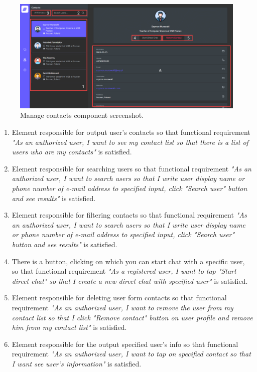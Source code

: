 \begin{figure}[H]
    \centering
    \includegraphics[width=1\textwidth]{Pictures/10_Messenger_manage_contacts}
    \caption{Manage contacts component screenshot.}\label{fig:figure10}
\end{figure}
\begin{enumerate}
    \item Element responsible for output user's contacts so that functional requirement
    \textit{"As an authorized user, I want to see my contact list so that there is a list of users
    who are my contacts"} is satisfied.
    \item Element responsible for searching users so that functional requirement
    \textit{"As an authorized user, I want to search users so that I write user display name or phone number
    of e-mail address to specified input, click "Search user" button and see
    results"} is satisfied.
    \item Element responsible for filtering contacts so that functional requirement
    \textit{"As an authorized user, I want to search users so that I write user display name or phone number of e-mail
    address to specified input, click "Search user" button and see results"} is satisfied.
    \item There is a button, clicking on which you can start chat with a specific user, so that functional requirement
    \textit{"As a registered user, I want to tap "Start direct chat" so that I create a new direct
    chat with specified user"} is satisfied.
    \item Element responsible for deleting user form contacts so that functional requirement
    \textit{"As an authorized user, I want to remove the user from my contact list so that I click "Remove contact"
    button on user profile and remove him from my contact list"} is satisfied.
    \item Element responsible for the output specified user's info so that functional requirement
    \textit{"As an authorized user, I want to tap on specified contact so that I want see user's information"}
    is satisfied.
\end{enumerate}


